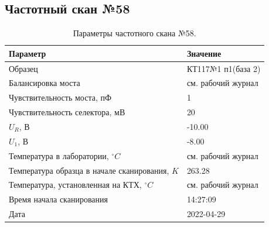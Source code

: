 \subsection{Частотный скан №58}
\begin{table}[!ht]
    \centering
    \caption{Параметры частотного скана №58.}
    \begin{tabular}{|l|l|}
        \hline
        Параметр                                       & Значение                  \\ \hline
        Образец                                        & КТ117№1 п1(база 2)        \\ \hline
        Балансировка моста                             & см. рабочий журнал        \\ \hline
        Чувствительность моста, пФ                     & 1                         \\ \hline
        Чувствительность селектора, мВ                 & 20                        \\ \hline
        $U_R$, В                                       & -10.00                    \\ \hline
        $U_1$, В                                       & -8.00                     \\ \hline
        Температура в лаборатории, $^\circ C$          & см. рабочий журнал        \\ \hline
        Температура образца в начале сканирования, $K$ & 263.28                    \\ \hline
        Температура, установленная на КТХ, $^\circ C$  & см. рабочий журнал        \\ \hline
        Время начала сканирования                      & 14:27:09                  \\ \hline
        Дата                                           & 2022-04-29                \\ \hline
    \end{tabular}
    \label{table:frequency_scan_58}
\end{table}


